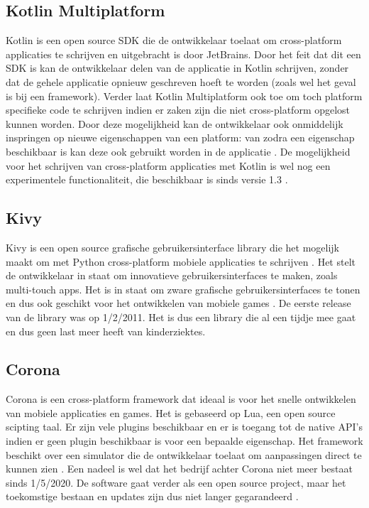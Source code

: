 \subsection{Kotlin Multiplatform}

Kotlin is een open source SDK die de ontwikkelaar toelaat om cross-platform applicaties te schrijven en uitgebracht is door JetBrains. Door het feit dat dit een SDK is kan de ontwikkelaar delen van de applicatie in Kotlin schrijven, zonder dat de gehele applicatie opnieuw geschreven hoeft te worden (zoals wel het geval is bij een framework). Verder laat Kotlin Multiplatform ook toe om toch platform specifieke code te schrijven indien er zaken zijn die niet cross-platform opgelost kunnen worden. Door deze mogelijkheid kan de ontwikkelaar ook onmiddelijk inspringen op nieuwe eigenschappen van een platform: van zodra een eigenschap beschikbaar is kan deze ook gebruikt worden in de applicatie \autocite{JetBrains2020}. De mogelijkheid voor het schrijven van cross-platform applicaties met Kotlin is wel nog een experimentele functionaliteit, die beschikbaar is sinds versie 1.3 \autocite{Belov2018}.


\subsection{Kivy}

Kivy is een open source grafische gebruikersinterface library die het mogelijk maakt om met Python cross-platform mobiele applicaties te schrijven \autocite{Vasilkov2015}. Het stelt de ontwikkelaar in staat om innovatieve gebruikersinterfaces te maken, zoals multi-touch apps. Het is in staat om zware grafische gebruikersinterfaces te tonen en dus ook geschikt voor het ontwikkelen van mobiele games \autocite{Kivy2020}. De eerste release van de library was op 1/2/2011. Het is dus een library die al een tijdje mee gaat en dus geen last meer heeft van kinderziektes.

\subsection{Corona}

Corona is een cross-platform framework dat ideaal is voor het snelle ontwikkelen van mobiele applicaties en games. Het is gebaseerd op Lua, een open source scipting taal. Er zijn vele plugins beschikbaar en er is toegang tot de native API's indien er geen plugin beschikbaar is voor een bepaalde eigenschap. Het framework beschikt over een simulator die de ontwikkelaar toelaat om aanpassingen direct te kunnen zien \autocite{Coronalabs2020}. Een nadeel is wel dat het bedrijf achter Corona niet meer bestaat sinds 1/5/2020. De software gaat verder als een open source project, maar het toekomstige bestaan en updates zijn dus niet langer gegarandeerd \autocite{Shcherban2020}.


